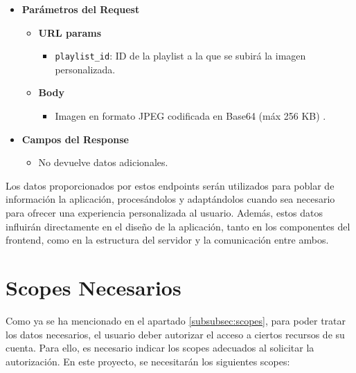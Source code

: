 \begin{itemize}
    \item \textbf{Parámetros del Request}
          \begin{itemize}
              \item \textbf{URL params}
                    \begin{itemize}
                        \item \texttt{playlist\_id}: ID de la playlist a la que se subirá la imagen personalizada.
                    \end{itemize}
              \item \textbf{Body}
                    \begin{itemize}
                        \item Imagen en formato JPEG codificada en Base64 (máx 256 KB) .
                    \end{itemize}
          \end{itemize}
    \item \textbf{Campos del Response}
          \begin{itemize}
              \item No devuelve datos adicionales.
          \end{itemize}
\end{itemize}

Los datos proporcionados por estos endpoints serán utilizados para poblar de información la aplicación, procesándolos y adaptándolos cuando sea necesario para ofrecer una experiencia personalizada al usuario. Además, estos datos influirán directamente en el diseño de la aplicación, tanto en los componentes del frontend, como en la estructura del servidor y la comunicación entre ambos.

\section{Scopes Necesarios}

Como ya se ha mencionado en el apartado \ref{subsubsec:scopes}, para poder tratar los datos necesarios, el usuario deber autorizar el acceso a ciertos recursos de su cuenta. Para ello, es necesario indicar los scopes adecuados al solicitar la autorización. En este proyecto, se necesitarán los siguientes scopes:

